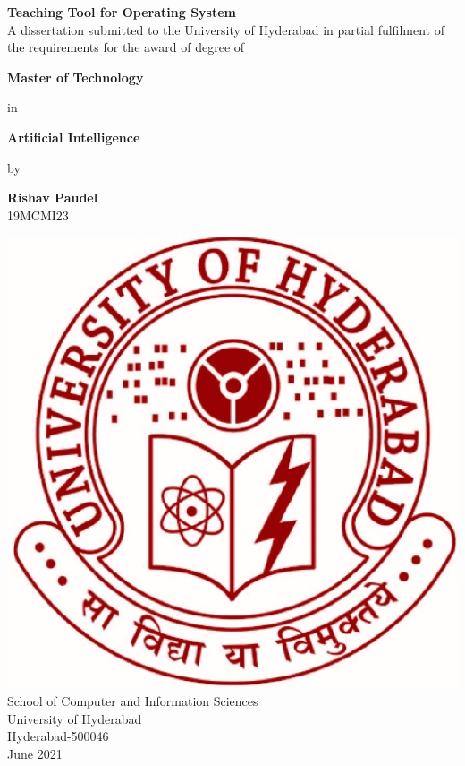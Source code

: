 \begin{titlepage}

\begin{center}


\Huge {\textbf {Teaching Tool for Operating System}}\\[2 cm]

\large
A dissertation submitted to the University of Hyderabad in partial fulfilment of the
requirements for the award of degree of

\vspace{4 mm}
{\Large \textbf{Master of Technology}}

\vspace{2 mm}
in

\vspace{2 mm}
{\Large \textbf{Artificial Intelligence}}

\vspace{4 mm}
by
 
\vspace{2 mm}
{\Large \textbf{Rishav Paudel}\\}
19MCMI23

\vfill

\includegraphics[scale=0.3]{./uohyd.eps}\\[1cm]
\normalsize
\textsc School of Computer and Information Sciences\\
University of Hyderabad\\
Hyderabad-500046\\
\vspace{0.5cm}
June 2021
\end{center}

\end{titlepage}
